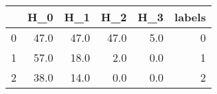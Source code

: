 \begin{tabular}{lrrrrr}
\toprule
{} &   H\_0 &   H\_1 &   H\_2 &  H\_3 &  labels \\
\midrule
0 &  47.0 &  47.0 &  47.0 &  5.0 &       0 \\
1 &  57.0 &  18.0 &   2.0 &  0.0 &       1 \\
2 &  38.0 &  14.0 &   0.0 &  0.0 &       2 \\
\bottomrule
\end{tabular}
